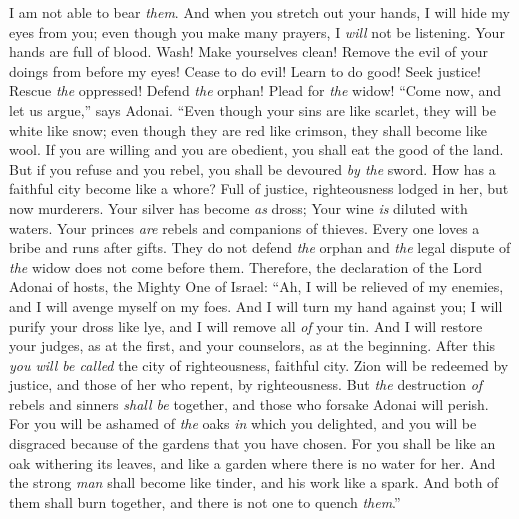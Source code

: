 \begin{biblechapter}
I am not able to bear \textit{them}.
\verse And when you stretch out your hands, 
I will hide my eyes from you; 
even though you make many prayers, 
I \textit{will} not be listening. 
Your hands are full of blood.
\verse Wash! Make yourselves clean! 
Remove the evil of your doings from before my eyes! 
Cease to do evil!
\verse Learn to do good! 
Seek justice! Rescue \textit{the} oppressed! 
Defend \textit{the} orphan! Plead for \textit{the} widow!
\verse “Come now, and let us argue,” says Adonai. 
“Even though your sins are like scarlet, they will be white like snow; 
even though they are red like crimson, they shall become like wool.
\verse If you are willing and you are obedient, 
you shall eat the good of the land.
\verse But if you refuse and you rebel, you shall be devoured \textit{by the} sword.
 How has a faithful city become like a whore? 
Full of justice, righteousness lodged in her, but now murderers.
\verse Your silver has become \textit{as} dross; 
Your wine \textit{is} diluted with waters.
\verse Your princes \textit{are} rebels 
and companions of thieves. 
Every one loves a bribe 
and runs after gifts. 
They do not defend \textit{the} orphan 
and \textit{the} legal dispute of \textit{the} widow does not come before them.
\verse Therefore, the declaration of the Lord Adonai of hosts, the Mighty One of Israel: 
“Ah, I will be relieved of my enemies, 
and I will avenge myself on my foes.
\verse And I will turn my hand against you; 
I will purify your dross like lye, 
and I will remove all \textit{of} your tin.
\verse And I will restore your judges, as at the first, 
and your counselors, as at the beginning. 
After this \textit{you will be called} the city of righteousness, 
faithful city.
\verse Zion will be redeemed by justice, 
and those of her who repent, by righteousness.
\verse But \textit{the} destruction \textit{of} rebels and sinners \textit{shall be} together, 
and those who forsake Adonai will perish.
\verse For you will be ashamed of \textit{the} oaks \textit{in} which you delighted, 
and you will be disgraced because of the gardens that you have chosen.
\verse For you shall be like an oak withering its leaves, 
and like a garden where there is no water for her.
\verse And the strong \textit{man} shall become like tinder, 
and his work like a spark. 
And both of them shall burn together, 
and there is not one to quench \textit{them}.”
\end{biblechapter}

